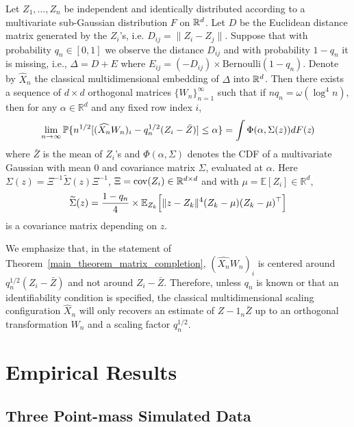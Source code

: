 \begin{theorem}[Central Limit Theorem for $\Delta = D$ with missing entries]
\label{main_theorem_matrix_completion} Let $Z_1, \dots, Z_n$ be
independent and identically distributed according to a multivariate sub-Gaussian distribution $F$ on $\R^d$. Let $D$ be the
Euclidean distance matrix generated by the $Z_i$'s, i.e. $D_{ij} =
\|Z_i - Z_j\|$. Suppose that with probability $q_n \in [0,1]$ we
observe the distance $D_{ij}$ and with probability $1 - q_n$ it is
missing, i.e., $\Delta = D + E$ where $E_{ij} = (- D_{ij}) \times
\mathrm{Bernoulli}(1-q_n)$. Denote by $\hat{X}_n$ the classical
multidimensional embedding of $\Delta$ into $\R^d$.  Then there exists a sequence
of $d \times d$ orthogonal matrices $\{W_n\}_{n=1}^{\infty}$ such that
if $n q_n = \omega(\log^{4}{n})$, then for any $\alpha \in
\mathbb{R}^{d}$ and any fixed row index $i$,
  $$ \lim_{n {\to} \infty} \mathbb{P} \{n^{1/2} [(\hat{X_n}W_n)_{i} - q_n^{1/2} (Z_i - \bar{Z})] \leq \alpha\} = \int \Phi(\alpha, \Sigma(z)) dF(\emph{z})$$
  where $\bar{Z}$ is the mean of $Z_i$'s and $\Phi(\alpha, \Sigma)$ denotes the CDF of a multivariate Gaussian with mean $0$ and covariance matrix $\Sigma$, evaluated at $\alpha$. 
  Here $\Sigma (z)= {\Xi}^{-1} \widetilde{\Sigma}(z) {\Xi}^{-1}$, $\Xi = \mathrm{cov}(Z_i) \in \R^{d \times d}$ and with $\mu = \mathbb{E}[Z_i] \in \mathbb{R}^{d}$,
  $$\widetilde{\Sigma} (z) = \frac{1-q_n}{4} \times \mathbb{E}_{Z_k} \Bigl[ \|z - Z_k\|^4 (Z_k- {\mu}) (Z_k - {\mu})^\top\Bigr]$$ 
  is a covariance matrix depending on $z$. 
\end{theorem}
\begin{remark}
We emphasize that, in the statement of Theorem~\ref{main_theorem_matrix_completion}, 
$(\hat{X_n}W_n)_{i}$ is centered around $q_n^{1/2}(Z_i - \bar{Z})$ and not around $Z_i - \bar{Z}$. Therefore, unless $q_n$ is known or that an identifiability condition is specified, the classical multidimensional scaling configuration $\hat{X}_n$ will only recovers an estimate of $Z - 1_n \bar{Z}$ up to an orthogonal transformation $W_n$ and a scaling factor $q_n^{1/2}$.
\end{remark}

\section{Empirical Results}
\label{ER}

\subsection{Three Point-mass Simulated Data}
\label{SD}

